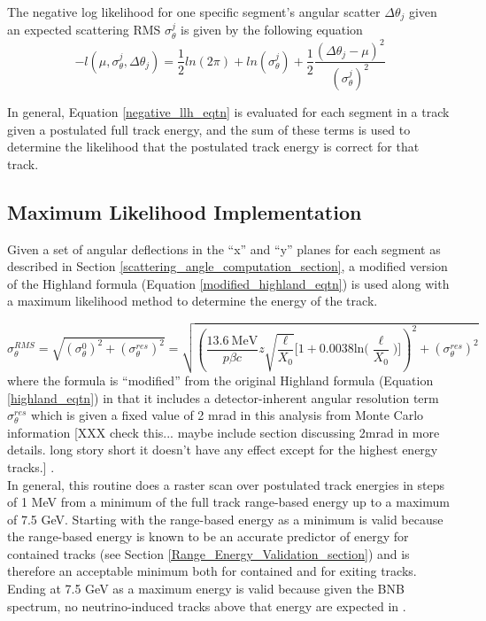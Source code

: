 The negative log likelihood for one specific segment's angular scatter $\Delta\theta_j$ given an expected scattering RMS $\sigma_\theta^j$ is given by the following equation
\begin{equation}\label{negative_llh_eqtn}
-l(\mu, \sigma_\theta^j, \Delta\theta_j) = \frac{1}{2}ln(2\pi) + ln(\sigma_\theta^j) + \frac{1}{2}\frac{(\Delta\theta_j-\mu)^2}{(\sigma_\theta^j)^2}
\end{equation}

In general, Equation \ref{negative_llh_eqtn} is evaluated for each segment in a track given a postulated full track energy, and the sum of these terms is used to determine the likelihood that the postulated track energy is correct for that track.


\subsection{Maximum Likelihood Implementation}\label{maximum_likelihood_section}

Given a set of angular deflections in the ``x'' and ``y'' planes for each segment as described in Section \ref{scattering_angle_computation_section}, a modified version of the Highland formula (Equation \ref{modified_highland_eqtn}) is used along with a maximum likelihood method to determine the energy of the track. 

\begin{equation}\label{modified_highland_eqtn}
\sigma_{\theta}^{RMS} = \sqrt{ (\sigma_\theta^0)^2 + (\sigma_\theta^{res})^2} = \sqrt{ (\frac{13.6\  \text{MeV}}{p\beta c}z\sqrt{\frac{\ell}{X_0}}\Big[1+0.0038\text{ln}\Big(\frac{\ell}{X_0}\Big)\Big])^2 + (\sigma_\theta^{res})^2 }
\end{equation}
where the formula is ``modified'' from the original Highland formula (Equation \ref{highland_eqtn}) in that it includes a detector-inherent angular resolution term $\sigma_\theta^{res}$ which is given a fixed value of 2 mrad in this analysis from Monte Carlo information [XXX check this... maybe include section discussing 2mrad in more details. long story short it doesn't have any effect except for the highest energy tracks.] \cite{leonidas2}.\\

In general, this routine does a raster scan over postulated track energies in steps of 1 MeV from a minimum of the full track range-based energy up to a maximum of 7.5 GeV. Starting with the range-based energy as a minimum is valid because the range-based energy is known to be an accurate predictor of energy for contained tracks (see Section \ref{Range_Energy_Validation_section}) and is therefore an acceptable minimum both for contained and for exiting tracks. Ending at 7.5 GeV as a maximum energy is valid because given the BNB spectrum, no neutrino-induced tracks above that energy are expected in {\ub}.\\

